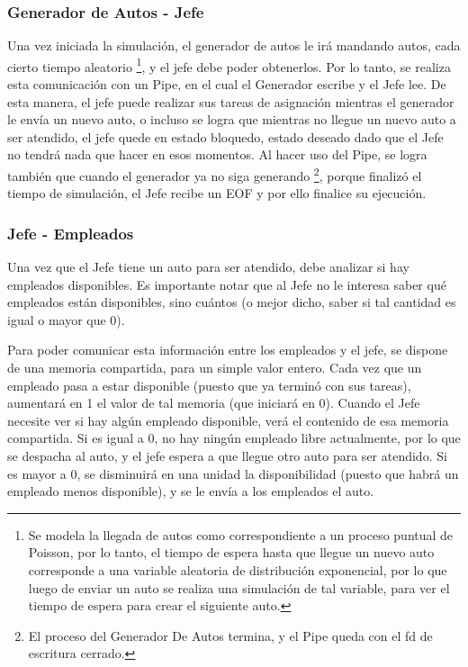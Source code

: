 \documentclass[a4paper,12pt]{article}
\begin{document}
\subsubsection{Generador de Autos - Jefe}
Una vez iniciada la simulación, el generador de autos le irá mandando autos, cada cierto tiempo aleatorio \footnote{Se modela la llegada de autos como correspondiente a un proceso puntual de Poisson, por lo tanto, el tiempo de espera hasta que llegue un nuevo auto corresponde a una variable aleatoria de distribución exponencial, por lo que luego de enviar un auto se realiza una simulación de tal variable, para ver el tiempo de espera para crear el siguiente auto.}, y el jefe debe poder obtenerlos.
Por lo tanto, se realiza esta comunicación con un Pipe, en el cual el Generador escribe y el Jefe lee. De esta manera, el jefe puede realizar sus tareas de asignación mientras el generador le envía un nuevo auto, o incluso se logra que mientras no llegue un nuevo auto a ser atendido, el jefe quede en estado bloquedo, estado deseado dado que el Jefe no tendrá nada que hacer en esos momentos.
Al hacer uso del Pipe, se logra también que cuando el generador ya no siga generando \footnote{El proceso del Generador De Autos termina, y el Pipe queda con el fd de escritura cerrado.}, porque finalizó el tiempo de simulación, el Jefe recibe un EOF y por ello finalice su ejecución.

\subsubsection{Jefe - Empleados}
Una vez que el Jefe tiene un auto para ser atendido, debe analizar si hay empleados disponibles. Es importante notar que al Jefe no le interesa saber qué empleados están disponibles, sino cuántos (o mejor dicho, saber si tal cantidad es igual o mayor que 0).

Para poder comunicar esta información entre los empleados y el jefe, se dispone de una memoria compartida, para un simple valor entero. Cada vez que un empleado pasa a estar disponible (puesto que ya terminó con sus tareas), aumentará en 1 el valor de tal memoria (que iniciará en 0). Cuando el Jefe necesite ver si hay algún empleado disponible, verá el contenido de esa memoria compartida. Si es igual a 0, no hay ningún empleado libre actualmente, por lo que se despacha al auto, y el jefe espera a que llegue otro auto para ser atendido. Si es mayor a 0, se disminuirá en una unidad la disponibilidad (puesto que habrá un empleado menos disponible), y se le envía a los empleados el auto. 
\end{document}
